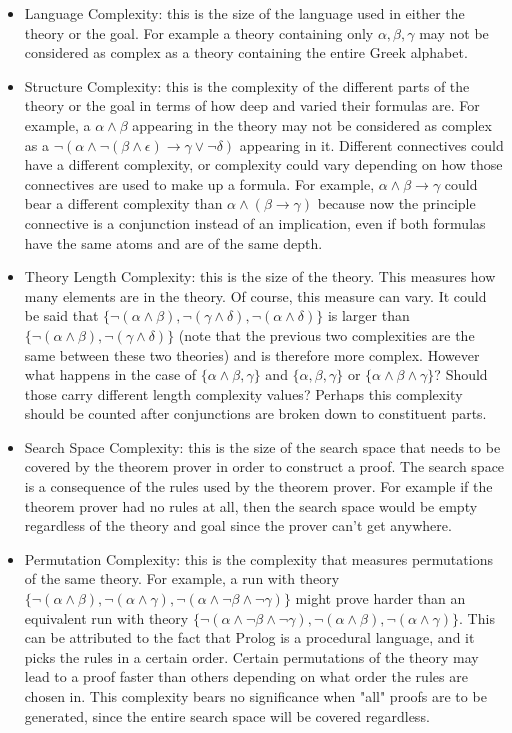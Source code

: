 \documentclass[11pt,twoside,a4paper]{report}
\begin{document}
\begin{itemize}
\item
Language Complexity: this is the size of the language used in either the theory or the goal. For example a theory containing only $\alpha, \beta, \gamma$ may not be considered as complex as a theory containing the entire Greek alphabet.
\item
Structure Complexity: this is the complexity of the different parts of the theory or the goal in terms of how deep and varied their formulas are. For example, a $\alpha\wedge\beta$ appearing in the theory may not be considered as complex as a $\neg(\alpha\wedge\neg(\beta\wedge\epsilon)\rightarrow\gamma\vee\neg\delta)$ appearing in it. Different connectives could have a different complexity, or complexity could vary depending on how those connectives are used to make up a formula. For example, $\alpha\wedge\beta\rightarrow\gamma$ could bear a different complexity than $\alpha\wedge(\beta\rightarrow\gamma)$ because now the principle connective is a conjunction instead of an implication, even if both formulas have the same atoms and are of the same depth.
\item
Theory Length Complexity: this is the size of the theory. This measures how many elements are in the theory. Of course, this measure can vary. It could be said that $\{\neg(\alpha\wedge\beta), \neg(\gamma\wedge\delta), \neg(\alpha\wedge\delta)\}$ is larger than $\{\neg(\alpha\wedge\beta), \neg(\gamma\wedge\delta)\}$ (note that the previous two complexities are the same between these two theories) and is therefore more complex. However what happens in the case of $\{\alpha\wedge\beta, \gamma\}$ and $\{\alpha, \beta, \gamma\}$ or $\{\alpha\wedge\beta\wedge\gamma\}$? Should those carry different length complexity values? Perhaps this complexity should be counted after conjunctions are broken down to constituent parts.
\item
Search Space Complexity: this is the size of the search space that needs to be covered by the theorem prover in order to construct a proof. The search space is a consequence of the rules used by the theorem prover. For example if the theorem prover had no rules at all, then the search space would be empty regardless of the theory and goal since the prover can't get anywhere.
\item
Permutation Complexity: this is the complexity that measures permutations of the same theory. For example, a run with theory $\{\neg(\alpha\wedge\beta), \neg(\alpha\wedge\gamma), \neg(\alpha\wedge\neg\beta\wedge\neg\gamma)\}$ might prove harder than an equivalent run with theory $\{\neg(\alpha\wedge\neg\beta\wedge\neg\gamma), \neg(\alpha\wedge\beta), \neg(\alpha\wedge\gamma)\}$. This can be attributed to the fact that Prolog is a procedural language, and it picks the rules in a certain order. Certain permutations of the theory may lead to a proof faster than others depending on what order the rules are chosen in. This complexity bears no significance when "all" proofs are to be generated, since the entire search space will be covered regardless.

\end{itemize}
\end{document}
